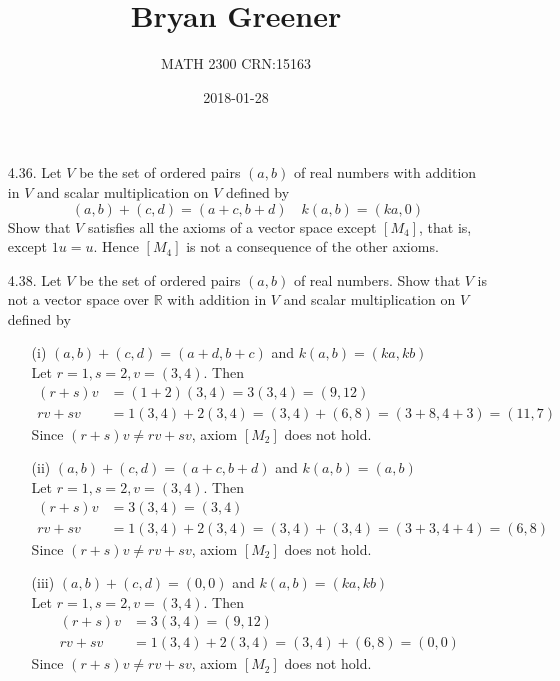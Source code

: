 \documentclass[12pt]{article}
\title{Bryan Greener}
\author{MATH 2300 CRN:15163}
\date{2018-01-28}
\begin{document}
\maketitle

\TabPositions{4cm}

\begin{enumerate}
\item[4.36.] Let $V$ be the set of ordered pairs $(a,b)$ of real numbers with addition in $V$ and scalar multiplication on $V$ defined by
			\[ (a,b) + (c,d) = (a+c,b+d) \quad k(a,b) = (ka,0) \]
			Show that $V$ satisfies all the axioms of a vector space except $[M_4]$, that is, except $1u=u$. Hence $[M_4]$ is not a consequence of the other axioms.
			
\item[4.38.] Let $V$ be the set of ordered pairs $(a,b)$ of real numbers. Show that $V$ is not a vector space over $\mathbb{R}$ with addition in $V$ and scalar multiplication on $V$ defined by
	\begin{enumerate}
	\item[(i)] $(a,b)+(c,d)=(a+d,b+c)$ and $k(a,b)=(ka,kb)$\\
		Let $r=1,s=2,v=(3,4)$. Then
		\begin{align*}
		(r+s)v &= (1+2)(3,4) = 3(3,4) = (9,12)\\
		rv + sv &= 1(3,4) + 2(3,4) = (3,4) + (6,8) = (3+8,4+3) = (11,7)
		\end{align*}
		Since $(r+s)v \neq rv + sv$, axiom $[M_2]$ does not hold.\\
		
	\item[(ii)] $(a,b)+(c,d)=(a+c,b+d)$ and $k(a,b)=(a,b)$\\
		Let $r=1,s=2,v=(3,4)$. Then
		\begin{align*}
		(r+s)v &= 3(3,4) = (3,4)\\
		rv + sv &= 1(3,4) + 2(3,4) = (3,4) + (3,4) = (3+3,4+4) = (6,8)
		\end{align*}
		Since $(r+s)v \neq rv + sv$, axiom $[M_2]$ does not hold.\\
		
	\item[(iii)] $(a,b)+(c,d)=(0,0)$ and $k(a,b)=(ka,kb)$\\
		Let $r=1,s=2,v=(3,4)$. Then
		\begin{align*}
		(r+s)v &= 3(3,4) = (9,12)\\
		rv + sv &= 1(3,4) + 2(3,4) = (3,4) + (6,8) = (0,0)
		\end{align*}
		Since $(r+s)v \neq rv + sv$, axiom $[M_2]$ does not hold.\\
	

\end{enumerate}
\end{enumerate}
\end{document}
